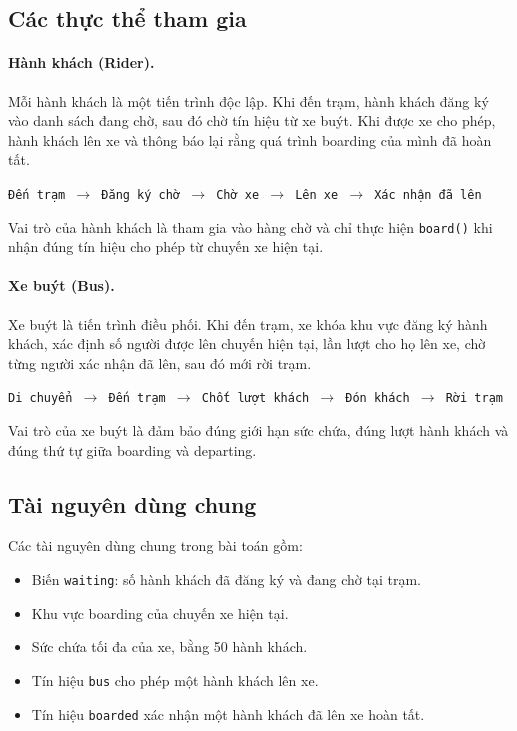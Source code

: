 \subsection{Các thực thể tham gia}

\paragraph{Hành khách (Rider).}

Mỗi hành khách là một tiến trình độc lập. Khi đến trạm, hành khách đăng
ký vào danh sách đang chờ, sau đó chờ tín hiệu từ xe buýt. Khi được xe
cho phép, hành khách lên xe và thông báo lại rằng quá trình boarding của
mình đã hoàn tất.

\begin{center}
\texttt{Đến trạm $\rightarrow$ Đăng ký chờ $\rightarrow$ Chờ xe
$\rightarrow$ Lên xe $\rightarrow$ Xác nhận đã lên}
\end{center}

Vai trò của hành khách là tham gia vào hàng chờ và chỉ thực hiện
\texttt{board()} khi nhận đúng tín hiệu cho phép từ chuyến xe hiện tại.

\paragraph{Xe buýt (Bus).}

Xe buýt là tiến trình điều phối. Khi đến trạm, xe khóa khu vực đăng ký
hành khách, xác định số người được lên chuyến hiện tại, lần lượt cho họ
lên xe, chờ từng người xác nhận đã lên, sau đó mới rời trạm.

\begin{center}
\texttt{Di chuyển $\rightarrow$ Đến trạm $\rightarrow$ Chốt lượt khách
$\rightarrow$ Đón khách $\rightarrow$ Rời trạm}
\end{center}

Vai trò của xe buýt là đảm bảo đúng giới hạn sức chứa, đúng lượt hành
khách và đúng thứ tự giữa boarding và departing.

\subsection{Tài nguyên dùng chung}

Các tài nguyên dùng chung trong bài toán gồm:

\begin{itemize}
\item Biến \texttt{waiting}: số hành khách đã đăng ký và đang chờ
tại trạm.
\item Khu vực boarding của chuyến xe hiện tại.
\item Sức chứa tối đa của xe, bằng 50 hành khách.
\item Tín hiệu \texttt{bus} cho phép một hành khách lên xe.
\item Tín hiệu \texttt{boarded} xác nhận một hành khách đã lên xe
hoàn tất.
\end{itemize}


